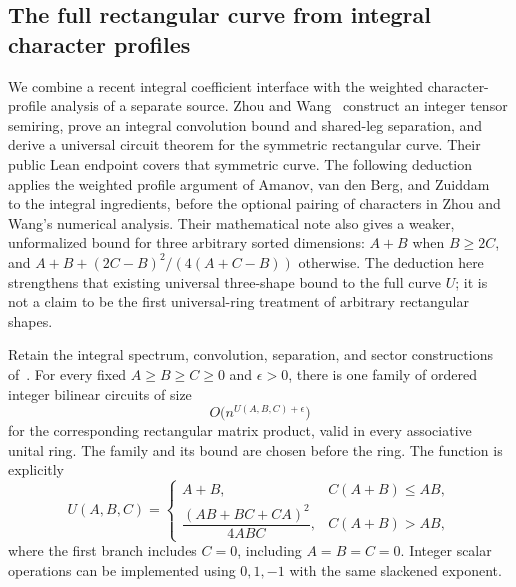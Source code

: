 \subsection{The full rectangular curve from integral character profiles}
\label{sec:integral-full-rectangular}

We combine a recent integral coefficient interface with the weighted character-profile analysis of a separate source.  Zhou and
Wang~\cite{zhouwang2026} construct an integer tensor semiring,
prove an integral convolution bound and shared-leg separation,
and derive a universal circuit theorem for the symmetric
rectangular curve.  Their public Lean endpoint covers that
symmetric curve.  The following deduction applies the weighted
profile argument of Amanov, van den Berg, and
Zuiddam~\cite[Sections~4.5--4.6]{amanov2026} to the integral
ingredients, before the optional pairing of characters in
Zhou and Wang's numerical analysis. Their mathematical note also gives a weaker, unformalized bound for
three arbitrary sorted dimensions: $A+B$ when $B\ge2C$, and
$A+B+(2C-B)^2/(4(A+C-B))$ otherwise. The deduction here
strengthens that existing universal three-shape bound to the full
curve $U$; it is not a claim to be the first universal-ring treatment
of arbitrary rectangular shapes.

\begin{theorem}
\label{thm:integral-full-rectangular}
Retain the integral spectrum, convolution, separation, and
sector constructions of~\cite{zhouwang2026}.  For every fixed
$A\ge B\ge C\ge0$ and $\epsilon>0$, there is one family of
ordered integer bilinear circuits of size
\[
 O\bigl(n^{U(A,B,C)+\epsilon}\bigr)
\]
for the corresponding rectangular matrix product, valid in
every associative unital ring.  The family and its bound are
chosen before the ring.  The function is explicitly
\[
 U(A,B,C)=\begin{cases}
 A+B,&C(A+B)\le AB,\\[2pt]
 \dfrac{(AB+BC+CA)^2}{4ABC},&C(A+B)>AB,
 \end{cases}
\]
where the first branch includes $C=0$, including $A=B=C=0$.  Integer scalar operations can be
implemented using $0,1,-1$ with the same slackened exponent.
\end{theorem}

